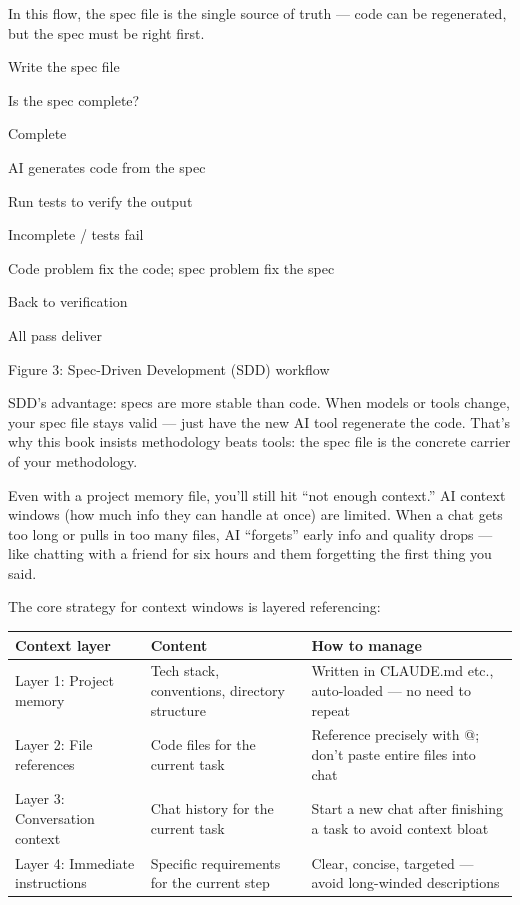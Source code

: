 In this flow, the spec file is the single source of truth — code can be regenerated, but the spec must be right first.

Write the spec file

Is the spec complete?

Complete

AI generates code from the spec

Run tests to verify the output

Incomplete / tests fail

Code problem fix the code; spec problem fix the spec

Back to verification

All pass deliver

\begin{center}\small\color{gray}Figure 3: Spec-Driven Development (SDD) workflow\end{center}

SDD's advantage: specs are more stable than code. When models or tools change, your spec file stays valid — just have the new AI tool regenerate the code. That's why this book insists methodology beats tools: the spec file is the concrete carrier of your methodology.


Even with a project memory file, you'll still hit “not enough context.” AI context windows (how much info they can handle at once) are limited. When a chat gets too long or pulls in too many files, AI “forgets” early info and quality drops — like chatting with a friend for six hours and them forgetting the first thing you said.

The core strategy for context windows is layered referencing:

\begin{center}
\begin{tabularx}{\linewidth}{|X|X|X|}
\hline
\textbf{Context layer} & \textbf{Content} & \textbf{How to manage} \tabularnewline
\hline
Layer 1: Project memory & Tech stack, conventions, directory structure & Written in CLAUDE.md etc., auto-loaded — no need to repeat \tabularnewline
Layer 2: File references & Code files for the current task & Reference precisely with @; don't paste entire files into chat \tabularnewline
Layer 3: Conversation context & Chat history for the current task & Start a new chat after finishing a task to avoid context bloat \tabularnewline
Layer 4: Immediate instructions & Specific requirements for the current step & Clear, concise, targeted — avoid long-winded descriptions \tabularnewline
\hline
\end{tabularx}
\end{center}

